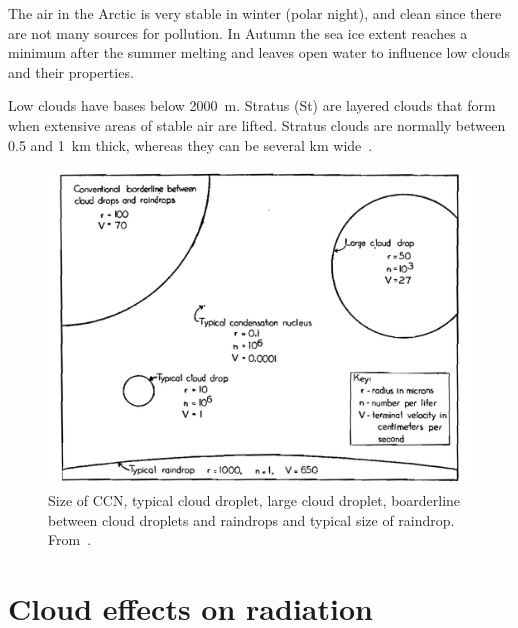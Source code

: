 The air in the Arctic is very stable in winter (polar night), and clean since there are not many sources for pollution. In Autumn the sea ice extent reaches a minimum after the summer melting and leaves open water to influence low clouds and their properties. 

Low clouds have bases below 2000~m. Stratus (St) are layered clouds that form when extensive areas of stable air are lifted. Stratus clouds are normally between 0.5 and 1~km thick, whereas they can be several km wide~\citep{Aguado2010}.

\begin{figure}
\label{fig:dropletsize}
\centering
\includegraphics[width=1\textwidth]{theory/dropletsize.png}
\caption{Size of CCN, typical cloud droplet, large cloud droplet, boarderline between cloud droplets and raindrops and typical size of raindrop.%
 From~\citep{McDonald1958}.}
\label{fig:Schf01}
\end{figure}
 
\section{Cloud effects on radiation}
